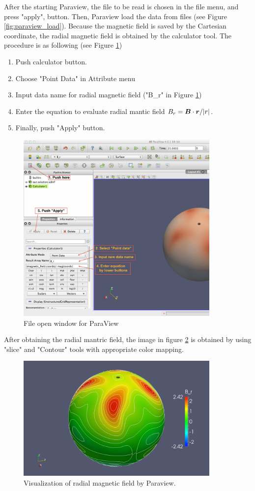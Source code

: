 After the starting Paraview, the file to be read is chosen in the file menu, and press "apply", button. Then, Paraview load the data from files (see Figure \ref{fig:paraview_load}). 
Because the magnetic field is saved by the Cartesian coordinate, the radial magnetic field is obtained by the calculator tool. The procedure is as following (see Figure \ref{fig:paraview_gen_Br})
%
\begin{enumerate}
\item Push calculator button.
\item Choose "Point Data" in Attribute menu
\item Input data name for radial magnetic field ("B\_r" in  Figure \ref{fig:paraview_gen_Br})
\item Enter the equation to evaluate radial mantic field $B_{r} = \mbox{\boldmath$B$} \cdot \mbox{\boldmath$r$} / |r|$.
\item Finally, push "Apply" button.
\end{enumerate}
%
%
\begin{figure}[htbp]
\begin{center}
\includegraphics*[width=100mm]{images/paraview_calc}
\caption{File open window for ParaView}
\label{fig:paraview_gen_Br}
\end{center}
\end{figure}
%
After obtaining the radial mantric field, the image in figure \ref{fig:paraview_br} is obtained by using "slice" and  "Contour" tools with appropriate color mapping.
%
\begin{figure}[htbp]
\begin{center}
\includegraphics*[width=100mm]{images/Paraview_Br}
\end{center}
\caption{Visualization of radial magnetic field by Paraview.}
\label{fig:paraview_br}
\end{figure}
%

